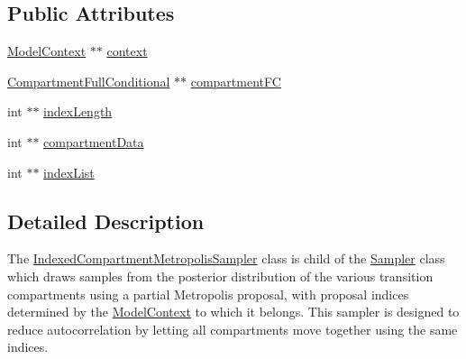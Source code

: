 \subsection*{Public Attributes}
\begin{DoxyCompactItemize}
\item 
\hyperlink{classSpatialSEIR_1_1ModelContext}{Model\-Context} $\ast$$\ast$ \hyperlink{classSpatialSEIR_1_1IndexedCompartmentMetropolisSampler_a83b05275c5b6e2da4d336eb09d7bb2b5}{context}
\item 
\hyperlink{classSpatialSEIR_1_1CompartmentFullConditional}{Compartment\-Full\-Conditional} $\ast$$\ast$ \hyperlink{classSpatialSEIR_1_1IndexedCompartmentMetropolisSampler_a67e3744835088d5612fbc3caf85dbac2}{compartment\-F\-C}
\item 
int $\ast$$\ast$ \hyperlink{classSpatialSEIR_1_1IndexedCompartmentMetropolisSampler_adb184082c1e6f3a4065edee600f69c1b}{index\-Length}
\item 
int $\ast$$\ast$ \hyperlink{classSpatialSEIR_1_1IndexedCompartmentMetropolisSampler_ad82e142ca51ec5b9099d4fce0ceed7c3}{compartment\-Data}
\item 
int $\ast$$\ast$ \hyperlink{classSpatialSEIR_1_1IndexedCompartmentMetropolisSampler_a69b2f84b4fe8bbb44831a106b3d55bfe}{index\-List}
\end{DoxyCompactItemize}


\subsection{Detailed Description}
The \hyperlink{classSpatialSEIR_1_1IndexedCompartmentMetropolisSampler}{Indexed\-Compartment\-Metropolis\-Sampler} class is child of the \hyperlink{classSpatialSEIR_1_1Sampler}{Sampler} class which draws samples from the posterior distribution of the various transition compartments using a partial Metropolis proposal, with proposal indices determined by the \hyperlink{classSpatialSEIR_1_1ModelContext}{Model\-Context} to which it belongs. This sampler is designed to reduce autocorrelation by letting all compartments move together using the same indices. 

